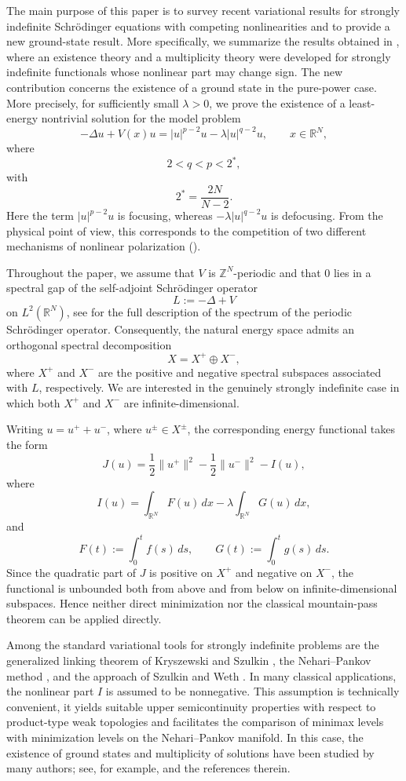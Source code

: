 \documentclass[10pt,a4paper]{amsart}
\numberwithin{equation}{section}
\begin{document}
The main purpose of this paper is to survey recent variational results for
strongly indefinite Schr\"odinger equations with competing nonlinearities and to provide a new ground-state result.
More specifically, we summarize the results obtained in
\cite{BB2022,BBS2025}, where an existence theory and a multiplicity theory
were developed for strongly indefinite functionals whose nonlinear part may
change sign. The new contribution concerns the existence of a ground state in the
pure-power case. More precisely, for sufficiently small $\lambda>0$, we
prove the existence of a least-energy nontrivial solution for the model
problem
\begin{equation}\label{eq:pure-power-problem}
-\Delta u+V(x)u
=
|u|^{p-2}u-\lambda |u|^{q-2}u,
\qquad x\in\mathbb{R}^N,
\end{equation}
where
\[
2<q<p<2^*,
\]
with
\[
2^*=
\dfrac{2N}{N-2}.
\]
Here the term $|u|^{p-2}u$ is focusing, whereas
$-\lambda |u|^{q-2}u$ is defocusing. From the physical point of view,
this corresponds to the competition of two different mechanisms of
nonlinear polarization (\cite{Slusher}).

Throughout the paper, we assume that $V$ is $\mathbb{Z}^N$-periodic and
that $0$ lies in a spectral gap of the self-adjoint Schr\"odinger operator
\[
L:=-\Delta+V
\]
on $L^2(\mathbb{R}^N)$, see \cite{ReedSimon} for the full description of the spectrum of the periodic Schr\"odinger operator. Consequently, the natural energy space admits an
orthogonal spectral decomposition
\[
X=X^+\oplus X^-,
\]
where $X^+$ and $X^-$ are the positive and negative spectral subspaces
associated with $L$, respectively. We are interested in the genuinely
strongly indefinite case in which both $X^+$ and $X^-$ are
infinite-dimensional.

Writing $u=u^++u^-$, where $u^\pm\in X^\pm$, the corresponding energy
functional takes the form
\begin{equation}
J(u)
=
\frac{1}{2}\|u^+\|^2
-
\frac{1}{2}\|u^-\|^2
-
I(u),
\end{equation}
where
\[
I(u)
=
\int_{\mathbb{R}^N}F(u)\,dx
-
\lambda\int_{\mathbb{R}^N}G(u)\,dx,
\]
and
\[
F(t):=\int_0^t f(s)\,ds,
\qquad
G(t):=\int_0^t g(s)\,ds.
\]
Since the quadratic part of $J$ is positive on $X^+$ and negative on
$X^-$, the functional is unbounded both from above and from below on
infinite-dimensional subspaces. Hence neither direct minimization nor the
classical mountain-pass theorem \cite{AmbrosettiRabinowitz} can be applied directly.

Among the standard variational tools for strongly indefinite problems are
the generalized linking theorem of Kryszewski and Szulkin \cite{KS}, the
Nehari--Pankov method \cite{Pankov}, and the approach of Szulkin and Weth
\cite{SW}. In many classical applications, the nonlinear part $I$ is
assumed to be nonnegative. This assumption is technically convenient, it
yields suitable upper semicontinuity properties with respect to
product-type weak topologies and facilitates the comparison of minimax
levels with minimization levels on the Nehari--Pankov manifold. In this case, the existence of ground states and multiplicity of solutions have been studied by many authors; see, for example, \cite{Li,Liu,Mederski2016,Rabinowitz,dePaiva} and the references therein.
\end{document}
